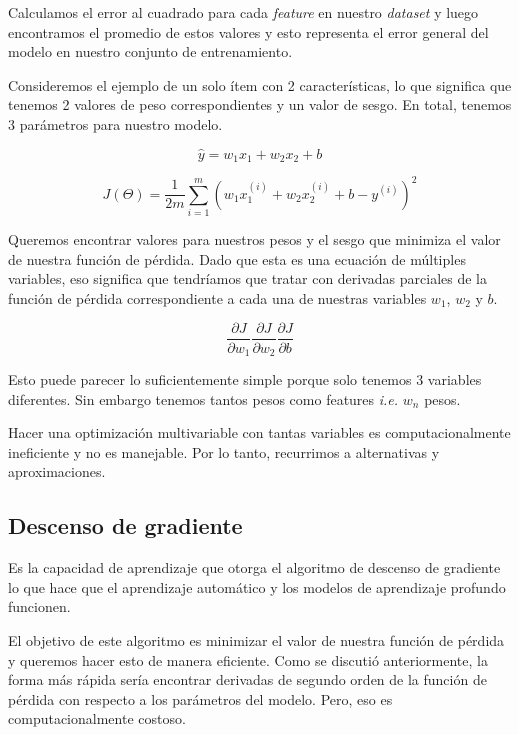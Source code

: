 \documentclass[a4paper,12pt]{article}
\begin{document}
Calculamos el error al cuadrado para cada \textit{feature} en nuestro \textit{dataset} y luego encontramos el promedio de estos valores y esto representa el error general del modelo en nuestro conjunto de entrenamiento.

Consideremos el ejemplo de un solo ítem con 2 características, lo que significa que tenemos 2 valores de peso correspondientes y un valor de sesgo. En total, tenemos 3 parámetros para nuestro modelo.

\begin{equation}
	\hat{y} = w_1x_1 + w_2x_2 + b
\end{equation}

\begin{equation}
	J(\Theta)=\frac{1}{2m} \sum_{i=1}^{m} (w_1x_1^{(i)}+w_2x_2^{(i)}+b-y^{(i)})^2
\end{equation}

Queremos encontrar valores para nuestros pesos y el sesgo que minimiza el valor de nuestra función de pérdida. Dado que esta es una ecuación de múltiples variables, eso significa que tendríamos que tratar con derivadas parciales de la función de pérdida correspondiente a cada una de nuestras variables $w_1$, $w_2$ y $b$.

\begin{equation}
	\frac{\partial J}{\partial w_1} \frac{\partial J}{\partial w_2}
	\frac{\partial J}{\partial b}
\end{equation}

Esto puede parecer lo suficientemente simple porque solo tenemos 3 variables diferentes.
Sin embargo tenemos tantos pesos como features \textit{i.e.} $w_n$ pesos.

Hacer una optimización multivariable con tantas variables es computacionalmente ineficiente y no es manejable. Por lo tanto, recurrimos a alternativas y aproximaciones.

\subsection{Descenso de gradiente}

Es la capacidad de aprendizaje que otorga el algoritmo de descenso de gradiente lo que hace que el aprendizaje automático y los modelos de aprendizaje profundo funcionen.

El objetivo de este algoritmo es minimizar el valor de nuestra función de pérdida y queremos hacer esto de manera eficiente.
Como se discutió anteriormente, la forma más rápida sería encontrar derivadas de segundo orden de la función de pérdida con respecto a los parámetros del modelo. Pero, eso es computacionalmente costoso.
\end{document}

